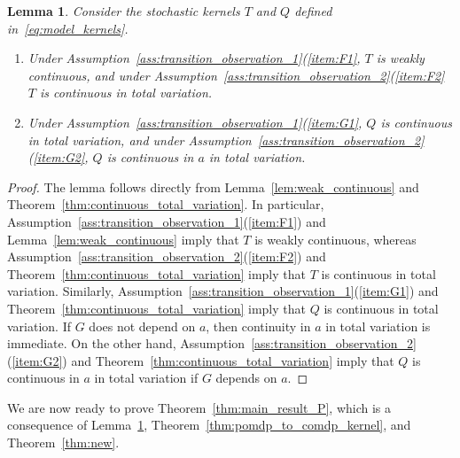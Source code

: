 \documentclass[11pt,onecolumn]{IEEEtran}  %
\newtheorem{lemma}{Lemma}
\theoremstyle{definition}
\begin{document}
\begin{lemma} \label{lem:kernel_assumptions}
    Consider the stochastic kernels $T$ and $Q$ defined in~\eqref{eq:model_kernels}.
    \begin{enumerate}
        \item Under Assumption~\ref{ass:transition_observation_1}(\ref{item:F1}, $T$ is weakly continuous, and under Assumption~\ref{ass:transition_observation_2}(\ref{item:F2} $T$ is continuous in total variation. %
        \item Under Assumption~\ref{ass:transition_observation_1}(\ref{item:G1}, $Q$ is continuous in total variation, and under Assumption~\ref{ass:transition_observation_2}(\ref{item:G2}, $Q$ is continuous in $a$ in total variation. %
    \end{enumerate}
\end{lemma}

\begin{proof}%
    The lemma follows directly from Lemma~\ref{lem:weak_continuous} and Theorem~\ref{thm:continuous_total_variation}. In particular, Assumption~\ref{ass:transition_observation_1}(\ref{item:F1}) and Lemma~\ref{lem:weak_continuous} imply that $T$ is weakly continuous, whereas Assumption~\ref{ass:transition_observation_2}(\ref{item:F2}) and Theorem~\ref{thm:continuous_total_variation} imply that $T$ is continuous in total variation. Similarly, Assumption~\ref{ass:transition_observation_1}(\ref{item:G1}) and Theorem~\ref{thm:continuous_total_variation} imply that $Q$ is continuous in total variation. If $G$ does not depend on $a$, then continuity in $a$ in total variation is immediate. On the other hand, Assumption~\ref{ass:transition_observation_2}(\ref{item:G2}) and Theorem~\ref{thm:continuous_total_variation} imply that $Q$ is continuous in $a$ in total variation if $G$ depends on $a$.
\end{proof}

We are now ready to prove Theorem~\ref{thm:main_result_P}, which is a consequence of Lemma~\ref{lem:kernel_assumptions}, Theorem~\ref{thm:pomdp_to_comdp_kernel}, and Theorem~\ref{thm:new}.
\end{document}
